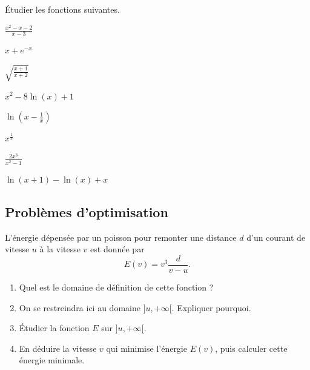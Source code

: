 \begin{exo}
    Étudier les fonctions suivantes.
    \begin{examplescol}{4}
        \item $\displaystyle \frac{x^{2}-x-2}{x-3} $
        \item $\displaystyle x+e^{-x} $
        \item $\displaystyle \sqrt{\frac{x+1}{x+2}} $
        \item $\displaystyle x^{2}-8\ln(x)+1 $
        \item $\displaystyle \ln(x-\frac{1}{x}) $
        \item $\displaystyle x^{\frac{1}{x}} $
        \item $\displaystyle \frac{2x^{3}}{x^{2}-1} $
        \item $\displaystyle \ln(x+1)-\ln(x)+x $
    \end{examplescol}
\end{exo}


\subsection{Problèmes d'optimisation}

\begin{exo}


    L'énergie dépensée par un poisson pour remonter une distance $d$ d'un courant de vitesse $u$ à la vitesse $v$ est donnée par
    $$
        E(v) = v^{3}\frac{d}{v-u}.
    $$

    \begin{enumerate}
        \item Quel est le domaine de définition de cette fonction ?

        \item On se restreindra ici au domaine $]u,+\infty[$. Expliquer pourquoi.

        \item Étudier la fonction $E$ sur $]u,+\infty[$.

        \item En déduire la vitesse $v$ qui minimise l'énergie $E(v)$, puis calculer cette énergie minimale.
    \end{enumerate}
\end{exo}

